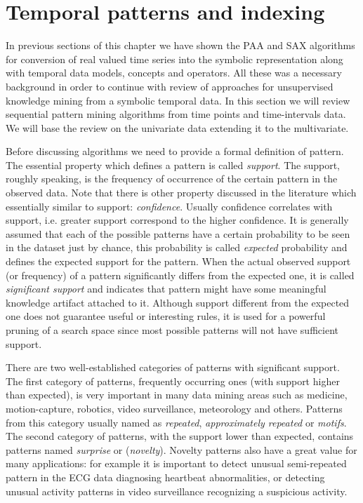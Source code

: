 \section{Temporal patterns and indexing} \label{tpatterns}
In previous sections of this chapter we have shown the PAA and SAX algorithms for conversion of real valued time series into the symbolic representation along with temporal data models, concepts and operators. All these was a necessary background in order to continue with review of approaches for unsupervised knowledge mining from a symbolic temporal data. In this section we will review sequential pattern mining algorithms from time points and time-intervals data. We will base the review on the univariate data extending it to the multivariate.


Before discussing algorithms we need to provide a formal definition of pattern. The essential property which defines a pattern is called \textit{support}. The support, roughly speaking, is the frequency of occurrence of the certain pattern in the observed data. Note that there is other property \cite{citeulike:2804633} discussed in the literature which essentially similar to support: \textit{confidence}. Usually confidence correlates with support, i.e. greater support correspond to the higher confidence. It is generally assumed that each of the possible patterns have a certain probability to be seen in the dataset just by chance, this probability is called \textit{expected} probability and defines the expected support for the pattern. When the actual observed support (or frequency) of a pattern significantly differs from the expected one, it is called \textit{significant support} and indicates that pattern might have some meaningful knowledge artifact attached to it. Although support different from the expected one does not guarantee useful or interesting rules, it is used for a powerful pruning of a search space since most possible patterns will not have sufficient support.

There are two well-established categories of patterns with significant support. The first category of patterns, frequently occurring ones (with support higher than expected), is very important in many data mining areas such as medicine, motion-capture, robotics, video surveillance, meteorology and others. Patterns from this category usually named as \textit{repeated}, \textit{approximately repeated} or \textit{motifs}. The second category of patterns, with the support lower than expected, contains patterns named \textit{surprise} or (\textit{novelty}). Novelty patterns also have a great value for many applications: for example it is important to detect unusual semi-repeated pattern in the ECG data diagnosing heartbeat abnormalities, or detecting unusual activity patterns in video surveillance recognizing a suspicious activity.

